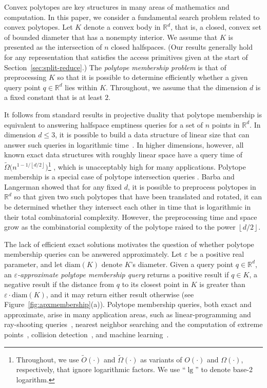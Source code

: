 \documentclass[11pt]{article}   \usepackage[letterpaper,hmargin=2.1cm,vmargin=3cm]{geometry}
\newcommand{\floor}[1]{\left\lfloor #1\right\rfloor}
\newcommand{\RE}{\mathbb{R}}    \newcommand{\ZZ}{\mathbb{Z}}    \newcommand{\eps}{\varepsilon}  \newcommand{\ST}{\,:\,}         \newcommand{\sq}{\square}
\newcommand{\SoftOh}{\widetilde{O}}
\newcommand{\SoftOmega}{\widetilde{\Omega}}
\newcommand{\diam}{\mathrm{diam}}
\begin{document}
Convex polytopes are key structures in many areas of mathematics and computation. In this paper, we consider a fundamental search problem related to convex polytopes. Let $K$ denote a convex body in $\RE^d$, that is, a closed, convex set of bounded diameter that has a nonempty interior. We assume that $K$ is presented as the intersection of $n$ closed halfspaces. (Our results generally hold for any representation that satisfies the access primitives given at the start of Section~\ref{sec:split-reduce}.) The \emph{polytope membership problem} is that of preprocessing $K$ so that it is possible to determine efficiently whether a given query point $q \in \RE^d$ lies within $K$. Throughout, we assume that the dimension $d$ is a fixed constant that is at least $2$. 

It follows from standard results in projective duality that polytope membership is equivalent to answering halfspace emptiness queries for a set of $n$ points in $\RE^d$. In dimension $d \leq 3$, it is possible to build a data structure of linear size that can answer such queries in logarithmic time~\cite{textbook}. In higher dimensions, however, all known exact data structures with roughly linear space have a query time
of $\SoftOmega\big(n^{1-1/\floor{d/2}}\big)$\footnote{Throughout, we use $\SoftOh(\cdot)$ and $\SoftOmega(\cdot)$ as variants of $O(\cdot)$ and $\Omega(\cdot)$, respectively, that ignore logarithmic factors. We use ``$\lg$'' to denote base-2 logarithm.}
\cite{Mat92}, which is unacceptably high for many applications. Polytope membership is a special case of polytope intersection queries \cite{ChD87,DoK83,BaL15}. Barba and Langerman \cite{BaL15} showed that for any fixed $d$, it is possible to preprocess polytopes in $\RE^d$ so that given two such polytopes that have been translated and rotated, it can be determined whether they intersect each other in time that is logarithmic in their total combinatorial complexity. However, the preprocessing time and space grow as the combinatorial complexity of the polytope raised to the power $\floor{d/2}$.

The lack of efficient exact solutions motivates the question of whether polytope membership queries can be answered approximately. Let $\eps$ be a positive real parameter, and let $\diam(K)$ denote $K$'s diameter. Given a query point $q \in \RE^d$, an \emph{$\eps$-approximate polytope membership query} returns a positive result if $q \in K$, a negative result if the distance from $q$ to its closest point in $K$ is greater than $\eps \cdot \diam(K)$, and it may return either result otherwise (see Figure~\ref{fig:apxmembership}(a)). Polytope membership queries, both exact and approximate, arise in many application areas, such as linear-programming and ray-shooting queries~\cite{lp-Chan, lp-Chan2, lp-Ramos, lp-Mat, lp-Mat2}, nearest neighbor searching and the computation of extreme points~\cite{hull-Chan,Clarkson-ANN}, collision detection~\cite{collision2}, and machine learning~\cite{SVM}. 
\end{document}
